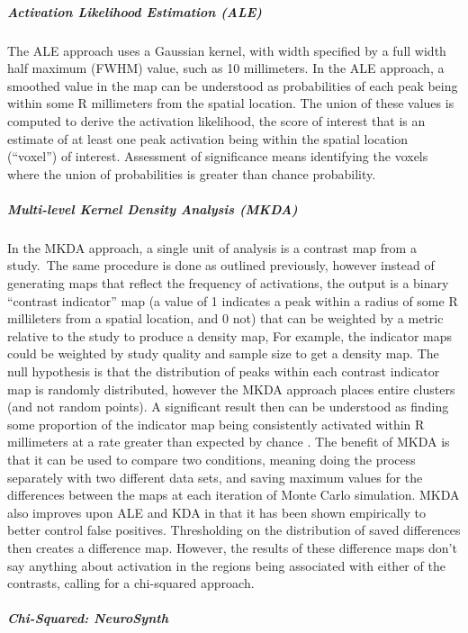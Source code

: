 \documentclass{report}
\begin{document}
\subparagraph{Activation Likelihood Estimation (ALE)}

The ALE approach uses a Gaussian kernel, with width specified by a full
width half maximum (FWHM) value, such as 10 millimeters. In the ALE
approach, a smoothed value in the map can be understood as probabilities
of each peak being within some R millimeters from the spatial location.
The union of these values is computed to derive the activation
likelihood, the score of interest that is an estimate of at least one
peak activation being within the spatial location (``voxel'') of
interest. Assessment of significance means identifying the voxels where
the union of probabilities is greater than chance probability.

\subparagraph{Multi-level Kernel Density Analysis (MKDA)}

In the MKDA approach, a single unit of analysis is a contrast map from a
study.~The same procedure is done as outlined previously, however
instead of generating maps that reflect the frequency of activations,
the output is a binary ``contrast indicator'' map (a value of 1
indicates a peak within a radius of some R millileters from a spatial
location, and 0 not) that can be weighted by a metric relative to the
study to produce a density map, For example, the indicator maps could be
weighted by study quality and sample size to get a density map. The null
hypothesis is that the distribution of peaks within each contrast
indicator map is randomly distributed, however the MKDA approach places
entire clusters (and not random points). A significant result then can
be understood as finding some proportion of the indicator map being
consistently activated within R millimeters at a rate greater than
expected by chance \cite{Salimi-Khorshidi2009-if}.
The benefit of MKDA is that it can be used to compare two conditions,
meaning doing the process separately with two different data sets, and
saving maximum values for the differences between the maps at each
iteration of Monte Carlo simulation. MKDA also improves upon ALE and KDA
in that it has been shown empirically to better control false positives.
Thresholding on the distribution of saved differences then creates a
difference map. However, the results of these difference maps don't say
anything about activation in the regions being associated with either of
the contrasts, calling for a chi-squared approach.

\subparagraph{Chi-Squared: NeuroSynth}
\end{document}
